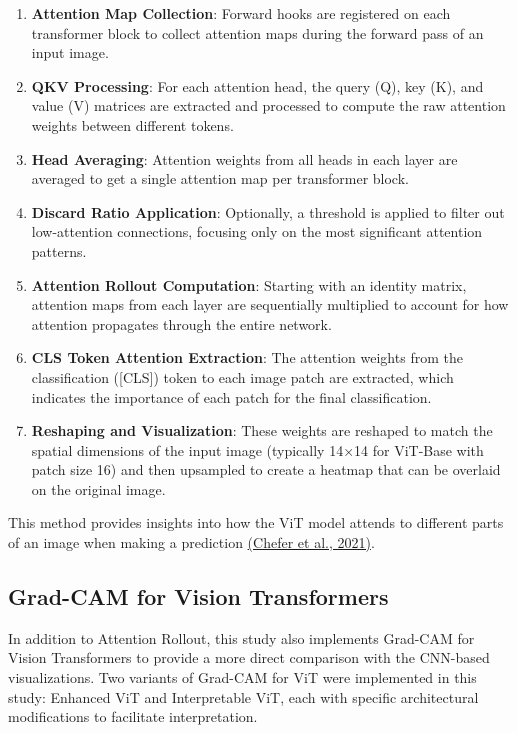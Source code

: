 \documentclass[a4paper,12pt]{report}
\begin{document}
\begin{enumerate}
    \item \textbf{Attention Map Collection}: Forward hooks are registered on each transformer block to collect attention maps during the forward pass of an input image.
    
    \item \textbf{QKV Processing}: For each attention head, the query (Q), key (K), and value (V) matrices are extracted and processed to compute the raw attention weights between different tokens.
    
    \item \textbf{Head Averaging}: Attention weights from all heads in each layer are averaged to get a single attention map per transformer block.
    
    \item \textbf{Discard Ratio Application}: Optionally, a threshold is applied to filter out low-attention connections, focusing only on the most significant attention patterns.
    
    \item \textbf{Attention Rollout Computation}: Starting with an identity matrix, attention maps from each layer are sequentially multiplied to account for how attention propagates through the entire network.
    
    \item \textbf{CLS Token Attention Extraction}: The attention weights from the classification ([CLS]) token to each image patch are extracted, which indicates the importance of each patch for the final classification.
    
    \item \textbf{Reshaping and Visualization}: These weights are reshaped to match the spatial dimensions of the input image (typically 14×14 for ViT-Base with patch size 16) and then upsampled to create a heatmap that can be overlaid on the original image.
\end{enumerate}

This method provides insights into how the ViT model attends to different parts of an image when making a prediction \href{https://arxiv.org/abs/2012.09838}{(Chefer et al., 2021)}.

\subsection{Grad-CAM for Vision Transformers}

In addition to Attention Rollout, this study also implements Grad-CAM for Vision Transformers to provide a more direct comparison with the CNN-based visualizations. Two variants of Grad-CAM for ViT were implemented in this study: Enhanced ViT and Interpretable ViT, each with specific architectural modifications to facilitate interpretation.
\end{document}
